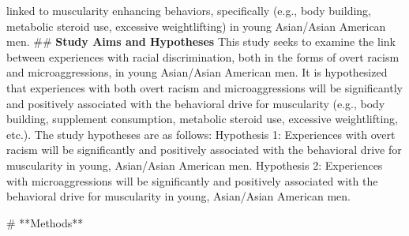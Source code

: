 \documentclass[
  12pt,
]{article}
\begin{document}
linked to muscularity enhancing behaviors, specifically (e.g., body
building, metabolic steroid use, excessive weightlifting) in young
Asian/Asian American men. \#\# \textbf{Study Aims and Hypotheses} This
study seeks to examine the link between experiences with racial
discrimination, both in the forms of overt racism and microaggressions,
in young Asian/Asian American men. It is hypothesized that experiences
with both overt racism and microaggressions will be significantly and
positively associated with the behavioral drive for muscularity (e.g.,
body building, supplement consumption, metabolic steroid use, excessive
weightlifting, etc.). The study hypotheses are as follows: Hypothesis 1:
Experiences with overt racism will be significantly and positively
associated with the behavioral drive for muscularity in young,
Asian/Asian American men. Hypothesis 2: Experiences with
microaggressions will be significantly and positively associated with
the behavioral drive for muscularity in young, Asian/Asian American men.

\begin{centering}
# **Methods**
\end{centering}
\end{document}
